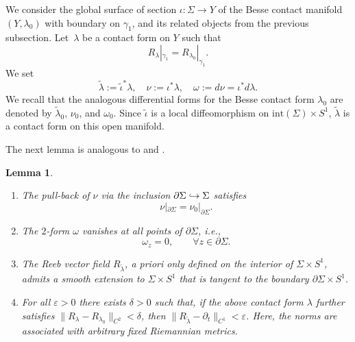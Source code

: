 \documentclass[11pt]{article}
\newcommand{\ie}{i.e.,\xspace}
\newcommand{\skpt}{\smallskip}
\numberwithin{equation}{section}
\let\epsilon\varepsilon
\newenvironment{enumeratei}
{\bgroup\def\theenumi{\roman{enumi}}\def\theenumii{\arabic{enumii}}\begin{enumerate}}
{\end{enumerate}\egroup}
\newcommand\hto{\mathrel{\lhook\joinrel\to}}
\newtheorem{lem}[thm]{Lemma}
\theoremstyle{definition}
\begin{document}
We consider the global surface of section $\iota:\Sigma\to Y$ of the Besse contact manifold $(Y,\lambda_0)$ with boundary on $\gamma_1$, and its related objects from the previous subsection.
Let~$\lambda$ be a contact form on $Y$ such that
\begin{equation}
\label{e:same_Reeb_on_gamma_1}
R_{\lambda}|_{\gamma_1}=R_{\lambda_0}|_{\gamma_1}.
\end{equation}
We set
\[
\tilde{\lambda} := \tilde\iota^* \lambda, \quad \nu := \iota^* \lambda, \quad \omega := d\nu = \iota^* d\lambda.
\]
We recall that the analogous differential forms for the Besse contact form $\lambda_0$ are denoted by $\tilde\lambda_0$, $\nu_0$, and $\omega_0$. Since $\tilde\iota$ is a local diffeomorphism on $\mathrm{int}(\Sigma) \times S^1$, $\tilde{\lambda}$ is a contact form on this open manifold.

The next lemma is analogous to \cite[Prop.\,3.6]{Abbondandolo:2018fb} and \cite[Prop.\,3.10]{Benedetti:2021aa}.

\skpt
\begin{lem}\label{l:nearly_Besse_normalized}
\begin{enumeratei}

\item\label{l:nearly_Besse_normalizedi}
The pull-back of $\nu$ via the inclusion $\partial\Sigma\hto\Sigma$ satisfies
\[
\nu|_{\partial\Sigma}=\nu_0|_{\partial\Sigma}.
\]

\item\label{l:nearly_Besse_normalizedii}
The $2$-form $\omega$ vanishes at all points of $\partial\Sigma$, \ie
\[
\omega_z= 0,\qquad \forall z\in \partial\Sigma.
\]

\item\label{l:nearly_Besse_normalizediii}
The Reeb vector field $R_{\tilde\lambda}$, a priori only defined on the interior of $\Sigma\times S^1$, admits a smooth extension to $\Sigma\times S^1$ that is tangent to the boundary $\partial \Sigma\times S^1$.

\item\label{l:nearly_Besse_normalizediv}
For all $\epsilon>0$ there exists $\delta>0$ such that, if the above contact form $\lambda$ further satisfies $\|R_\lambda-R_{\lambda_0}\|_{C^2}<\delta$, then $\|R_{\tilde\lambda}-\partial_t\|_{C^1}<\epsilon$. Here, the norms are associated with arbitrary fixed Riemannian metrics.
\end{enumeratei}
\end{lem}
\end{document}
